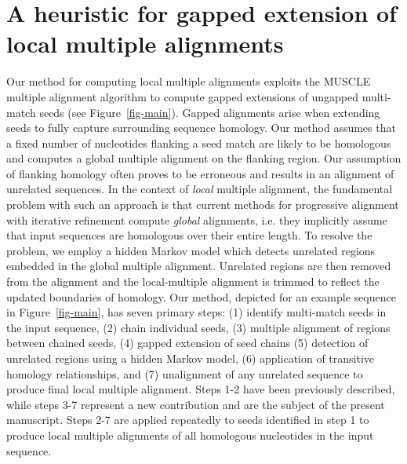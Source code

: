 \documentclass{llncs}
\begin{document}
\section{A heuristic for gapped extension of local multiple alignments}
Our method for computing local multiple alignments exploits the MUSCLE
multiple alignment algorithm to compute gapped extensions of ungapped
multi-match seeds (see Figure~\ref{fig-main}). Gapped alignments arise
when extending seeds to fully capture surrounding sequence
homology. Our method assumes that a fixed number of nucleotides
flanking a seed match are likely to be homologous and computes a
global multiple alignment on the flanking region.  Our assumption of
flanking homology often proves to be erroneous and results in an
alignment of unrelated sequences.  In the context of \textit{local}
multiple alignment, the fundamental problem with such an approach is
that current methods for progressive alignment with iterative
refinement compute \textit{global} alignments, i.e. they implicitly
assume that input sequences are homologous over their entire length.
To resolve the problem, we employ a hidden Markov model which detects
unrelated regions embedded in the global multiple alignment.
Unrelated regions are then removed from the alignment and the
local-multiple alignment is trimmed to reflect the updated boundaries
of homology. Our method, depicted for an example sequence in
Figure~\ref{fig-main}, has seven primary steps: (1) identify
multi-match seeds in the input sequence, (2) chain individual
seeds, (3) multiple alignment of regions between chained seeds, (4)
gapped extension of seed chains (5) detection of unrelated regions
using a hidden Markov model, (6) application of transitive homology
relationships, and (7) unalignment of any unrelated sequence to
produce final local multiple alignment.  Steps 1-2 have been previously
described\cite{ref-procrast}, while steps 3-7 represent a new contribution
and are the subject of the present manuscript. Steps 2-7 are applied
repeatedly to seeds identified in step 1 to produce local multiple
alignments of all homologous nucleotides in the input sequence.
\end{document}
